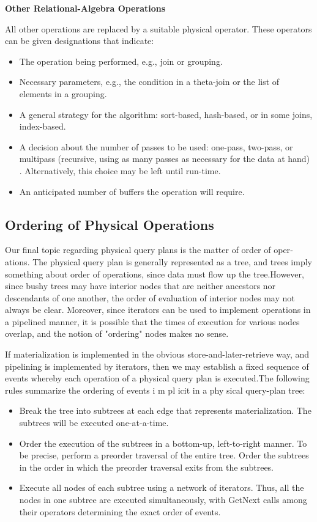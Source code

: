 \par \textbf{Other Relational-Algebra Operations}
\par All other operations are replaced by a suitable physical operator. These oper­ators can be given designations that indicate:
\begin{itemize}
    \item The operation being performed, e.g., join or grouping.
    \item Necessary parameters, e.g., the condition in a theta-join or the list of elements in a grouping.
    \item A general strategy for the algorithm: sort-based, hash-based, or in some joins, index-based.
    \item A decision about the number of passes to be used: one-pass, two-pass, or multipass (recursive, using as many passes as necessary for the data at hand) . Alternatively, this choice may be left until run-time.
    \item An anticipated number of buffers the operation will require.
\end{itemize}
\subsection{Ordering of Physical Operations}
Our final topic regarding physical query plans is the matter of order of oper­ations. The physical query plan is generally represented as a tree, and trees imply something about order of operations, since data must flow up the tree.However, since bushy trees may have interior nodes that are neither ancestors nor descendants of one another, the order of evaluation of interior nodes may not always be clear. Moreover, since iterators can be used to implement opera­tions in a pipelined manner, it is possible that the times of execution for various nodes overlap, and the notion of "ordering" nodes makes no sense. 
\par If materialization is implemented in the obvious store-and-later-retrieve way, and pipelining is implemented by iterators, then we may establish a fixed se­quence of events whereby each operation of a physical query plan is executed.The following rules summarize the ordering of events i m pl icit in a phy sical query-plan tree:
\begin{itemize}
    \item Break the tree into subtrees at each edge that represents materialization. The subtrees will be executed one-at-a-time.
    \item Order the execution of the subtrees in a bottom-up, left-to-right manner. To be precise, perform a preorder traversal of the entire tree. Order the subtrees in the order in which the preorder traversal exits from the subtrees.
    \item Execute all nodes of each subtree using a network of iterators. Thus, all the nodes in one subtree are executed simultaneously, with GetNext calls among their operators determining the exact order of events.
\end{itemize}

